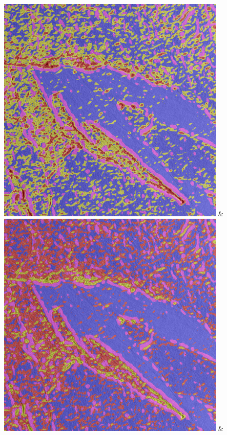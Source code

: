 \begin{table}[h!]
\begin{tabularx}{\textwidth}
		\includegraphics[width=0.9\linewidth]{images/gen/spatial_weight/p03_03.png_0.33.png} &
		\includegraphics[width=0.9\linewidth]{images/gen/spatial_weight/p03_03.png_0.66.png} &

\end{tabularx}
\end{table}
